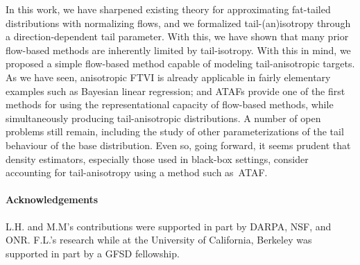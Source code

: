 \documentclass[thesis.tex]{subfiles}
\begin{document}
In this work, we have sharpened existing theory for approximating fat-tailed distributions with normalizing flows, and we formalized tail-(an)isotropy through a direction-dependent tail parameter. With this, we have shown that many prior flow-based methods are inherently limited by tail-isotropy. With this in mind, we proposed a simple flow-based method capable of modeling tail-anisotropic targets.
As we have seen, anisotropic FTVI is already applicable in fairly elementary examples such as Bayesian linear regression;
and ATAFs provide one of the first methods for using the representational capacity of flow-based methods,
while simultaneously producing tail-anisotropic distributions. A number of open problems still remain, including the study of other parameterizations of the tail behaviour of the base distribution. Even so, going forward, it seems prudent that density estimators, especially those used in black-box settings, consider accounting for tail-anisotropy using a method such as~ATAF.%


\paragraph{Acknowledgements}
L.H. and M.M's contributions were supported in part by DARPA, NSF, and ONR.
F.L.’s research while at the University of California, Berkeley was supported in part by a GFSD fellowship.


% 
% 

\end{document}
